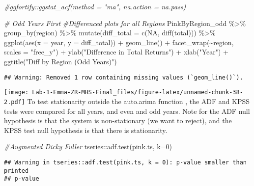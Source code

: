\documentclass[
]{article}
\newenvironment{Shaded}{\begin{snugshade}}{\end{snugshade}}
\newcommand{\AttributeTok}[1]{\textcolor[rgb]{0.77,0.63,0.00}{#1}}
\newcommand{\CommentTok}[1]{\textcolor[rgb]{0.56,0.35,0.01}{\textit{#1}}}
\newcommand{\ConstantTok}[1]{\textcolor[rgb]{0.00,0.00,0.00}{#1}}
\newcommand{\DecValTok}[1]{\textcolor[rgb]{0.00,0.00,0.81}{#1}}
\newcommand{\FunctionTok}[1]{\textcolor[rgb]{0.00,0.00,0.00}{#1}}
\newcommand{\NormalTok}[1]{#1}
\newcommand{\SpecialCharTok}[1]{\textcolor[rgb]{0.00,0.00,0.00}{#1}}
\newcommand{\StringTok}[1]{\textcolor[rgb]{0.31,0.60,0.02}{#1}}
\begin{document}
\begin{Shaded}
\begin{Highlighting}[]
  \CommentTok{\#ggfortify::ggstat\_acf(method = "ma", na.action = na.pass)}

\CommentTok{\# Odd Years First }
\CommentTok{\#Differenced plots for all Regions }
\NormalTok{PinkByRegion\_odd }\SpecialCharTok{\%\textgreater{}\%}
  \FunctionTok{group\_by}\NormalTok{(region) }\SpecialCharTok{\%\textgreater{}\%}
  \FunctionTok{mutate}\NormalTok{(}\AttributeTok{diff\_total =} \FunctionTok{c}\NormalTok{(}\ConstantTok{NA}\NormalTok{, }\FunctionTok{diff}\NormalTok{(total))) }\SpecialCharTok{\%\textgreater{}\%}
  \FunctionTok{ggplot}\NormalTok{(}\FunctionTok{aes}\NormalTok{(}\AttributeTok{x =}\NormalTok{ year, }\AttributeTok{y =}\NormalTok{ diff\_total)) }\SpecialCharTok{+}
  \FunctionTok{geom\_line}\NormalTok{() }\SpecialCharTok{+}
  \FunctionTok{facet\_wrap}\NormalTok{(}\SpecialCharTok{\textasciitilde{}}\NormalTok{region, }\AttributeTok{scales =} \StringTok{"free\_y"}\NormalTok{) }\SpecialCharTok{+}
  \FunctionTok{ylab}\NormalTok{(}\StringTok{"Difference in Total Returns"}\NormalTok{) }\SpecialCharTok{+}
  \FunctionTok{xlab}\NormalTok{(}\StringTok{"Year"}\NormalTok{) }\SpecialCharTok{+}
  \FunctionTok{ggtitle}\NormalTok{(}\StringTok{"Diff by Region (Odd Years)"}\NormalTok{) }
\end{Highlighting}
\end{Shaded}

\begin{verbatim}
## Warning: Removed 1 row containing missing values (`geom_line()`).
\end{verbatim}

\texttt{[image: Lab-1-Emma-ZR-MHS-Final\_files/figure-latex/unnamed-chunk-38-2.pdf]}
To test stationarity outside the auto.arima function , the ADF and KPSS
tests were compared for all years, and even and odd years. Note for the
ADF null hypothesis is that the system is non-stationary (we want to
reject), and the KPSS test null hypothesis is that there is
stationarity.

\begin{Shaded}
\begin{Highlighting}[]
\CommentTok{\#Augmented Dicky Fuller }
\NormalTok{tseries}\SpecialCharTok{::}\FunctionTok{adf.test}\NormalTok{(pink.ts, }\AttributeTok{k=}\DecValTok{0}\NormalTok{)}
\end{Highlighting}
\end{Shaded}

\begin{verbatim}
## Warning in tseries::adf.test(pink.ts, k = 0): p-value smaller than printed
## p-value
\end{verbatim}
\end{document}
